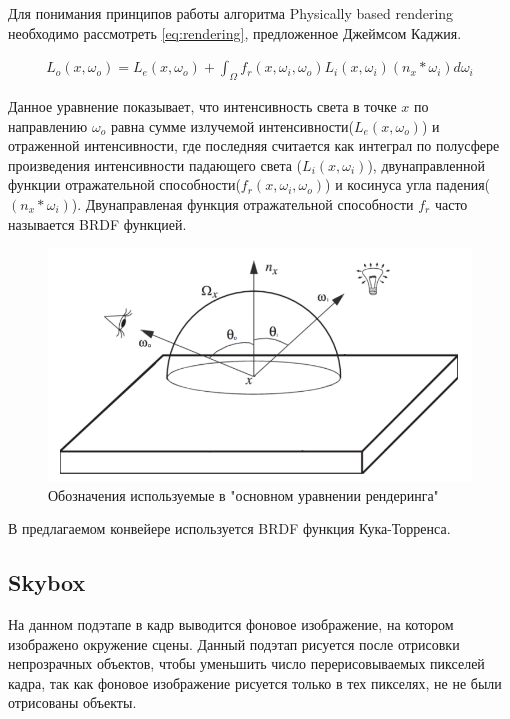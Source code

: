 			Для понимания принципов работы алгоритма Physically based rendering необходимо рассмотреть  \ref{eq:rendering}, предложенное Джеймсом Каджия. 
			
			\begin{equation}
				\label{eq:rendering}
				\begin{multlined}
					L_o(x, \omega_o) = L_e(x, \omega_o) + \int_{\Omega} f_r(x, \omega_i, \omega_o)L_i(x, \omega_i)(n_x * \omega_i)d\omega_i
				\end{multlined}
			\end{equation}
			
			Данное уравнение показывает, что интенсивность света в точке $x$ по направлению $\omega_o$ равна сумме излучемой интенсивности($L_e(x, \omega_o)$) и отраженной интенсивности, где последняя считается как интеграл по полусфере произведения интенсивности падающего света ($L_i(x, \omega_i)$), двунаправленной функции отражательной способности($f_r(x, \omega_i, \omega_o)$) и косинуса угла падения($(n_x * \omega_i)$). Двунаправленая функция отражательной способности $f_r$ часто называется BRDF функцией. 
			
			\begin{figure}[ht!] 
				\center
				\includegraphics [scale=0.6] {my_folder/images//rendering_eq}	
				\caption{Обозначения используемые в "основном уравнении рендеринга"} 
				\label{fig:base_rendering}
			\end{figure}
			
			В предлагаемом конвейере используется BRDF функция Кука-Торренса.
	\subsection{Skybox} \label{ch3:render_pass:skybox}
		На данном подэтапе в кадр выводится фоновое изображение, на котором изображено окружение сцены. Данный подэтап рисуется после отрисовки непрозрачных объектов, чтобы уменьшить число перерисовываемых пикселей кадра, так как фоновое изображение рисуется только в тех пикселях, не не были отрисованы объекты. 
		
